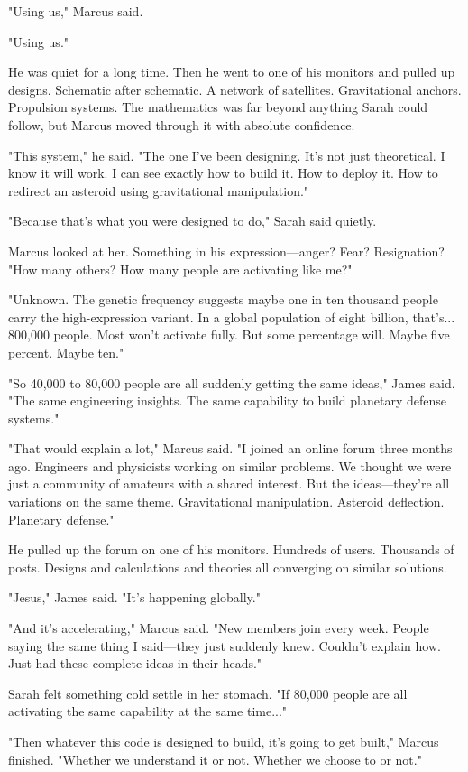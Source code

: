 "Using us," Marcus said.

"Using us."

He was quiet for a long time. Then he went to one of his monitors and pulled up designs. Schematic after schematic. A network of satellites. Gravitational anchors. Propulsion systems. The mathematics was far beyond anything Sarah could follow, but Marcus moved through it with absolute confidence.

"This system," he said. "The one I've been designing. It's not just theoretical. I know it will work. I can see exactly how to build it. How to deploy it. How to redirect an asteroid using gravitational manipulation."

"Because that's what you were designed to do," Sarah said quietly.

Marcus looked at her. Something in his expression—anger? Fear? Resignation? "How many others? How many people are activating like me?"

"Unknown. The genetic frequency suggests maybe one in ten thousand people carry the high-expression variant. In a global population of eight billion, that's... 800,000 people. Most won't activate fully. But some percentage will. Maybe five percent. Maybe ten."

"So 40,000 to 80,000 people are all suddenly getting the same ideas," James said. "The same engineering insights. The same capability to build planetary defense systems."

"That would explain a lot," Marcus said. "I joined an online forum three months ago. Engineers and physicists working on similar problems. We thought we were just a community of amateurs with a shared interest. But the ideas—they're all variations on the same theme. Gravitational manipulation. Asteroid deflection. Planetary defense."

He pulled up the forum on one of his monitors. Hundreds of users. Thousands of posts. Designs and calculations and theories all converging on similar solutions.

"Jesus," James said. "It's happening globally."

"And it's accelerating," Marcus said. "New members join every week. People saying the same thing I said—they just suddenly knew. Couldn't explain how. Just had these complete ideas in their heads."

Sarah felt something cold settle in her stomach. "If 80,000 people are all activating the same capability at the same time..."

"Then whatever this code is designed to build, it's going to get built," Marcus finished. "Whether we understand it or not. Whether we choose to or not."

